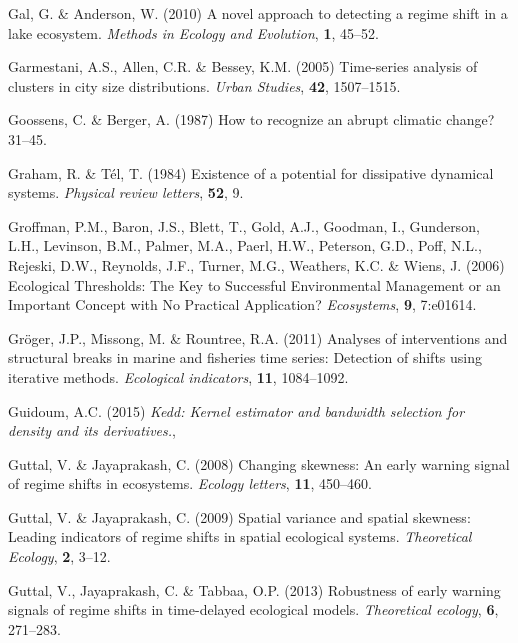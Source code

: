 \documentclass[print]{nuthesis}
\begin{document}
\leavevmode\hypertarget{ref-gal2010novel}{}%
Gal, G. \& Anderson, W. (2010) A novel approach to detecting a regime shift in a lake ecosystem. \emph{Methods in Ecology and Evolution}, \textbf{1}, 45--52.

\leavevmode\hypertarget{ref-garmestani2005time}{}%
Garmestani, A.S., Allen, C.R. \& Bessey, K.M. (2005) Time-series analysis of clusters in city size distributions. \emph{Urban Studies}, \textbf{42}, 1507--1515.

\leavevmode\hypertarget{ref-goossens1987recognize}{}%
Goossens, C. \& Berger, A. (1987) How to recognize an abrupt climatic change? 31--45.

\leavevmode\hypertarget{ref-graham1984existence}{}%
Graham, R. \& Tél, T. (1984) Existence of a potential for dissipative dynamical systems. \emph{Physical review letters}, \textbf{52}, 9.

\leavevmode\hypertarget{ref-groffman_ecological_2006}{}%
Groffman, P.M., Baron, J.S., Blett, T., Gold, A.J., Goodman, I., Gunderson, L.H., Levinson, B.M., Palmer, M.A., Paerl, H.W., Peterson, G.D., Poff, N.L., Rejeski, D.W., Reynolds, J.F., Turner, M.G., Weathers, K.C. \& Wiens, J. (2006) Ecological Thresholds: The Key to Successful Environmental Management or an Important Concept with No Practical Application? \emph{Ecosystems}, \textbf{9}, 7:e01614.

\leavevmode\hypertarget{ref-groger2011analyses}{}%
Gröger, J.P., Missong, M. \& Rountree, R.A. (2011) Analyses of interventions and structural breaks in marine and fisheries time series: Detection of shifts using iterative methods. \emph{Ecological indicators}, \textbf{11}, 1084--1092.

\leavevmode\hypertarget{ref-kedd}{}%
Guidoum, A.C. (2015) \emph{Kedd: Kernel estimator and bandwidth selection for density and its derivatives.},

\leavevmode\hypertarget{ref-guttal2008changing}{}%
Guttal, V. \& Jayaprakash, C. (2008) Changing skewness: An early warning signal of regime shifts in ecosystems. \emph{Ecology letters}, \textbf{11}, 450--460.

\leavevmode\hypertarget{ref-guttal2009spatial}{}%
Guttal, V. \& Jayaprakash, C. (2009) Spatial variance and spatial skewness: Leading indicators of regime shifts in spatial ecological systems. \emph{Theoretical Ecology}, \textbf{2}, 3--12.

\leavevmode\hypertarget{ref-guttal2013robustness}{}%
Guttal, V., Jayaprakash, C. \& Tabbaa, O.P. (2013) Robustness of early warning signals of regime shifts in time-delayed ecological models. \emph{Theoretical ecology}, \textbf{6}, 271--283.
\end{document}
